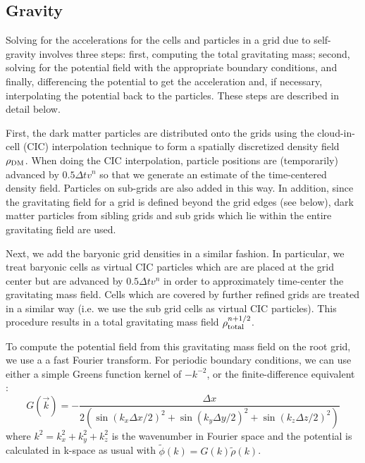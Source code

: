 \subsection{Gravity}
\label{sec.gravity}

Solving for the accelerations for the cells and particles in a grid due to self-gravity involves three steps: first, computing the total gravitating mass; second, solving for the potential field with the appropriate boundary conditions, and finally, differencing the potential to get the acceleration and, if necessary, interpolating the potential back to the particles. These steps are described in detail below.

First, the dark matter particles are distributed onto the grids using the cloud-in-cell (CIC) interpolation technique \citet{Hockney88} to form a spatially discretized density field $\rho_{\rm DM}$.  When doing the CIC interpolation, particle positions are (temporarily) advanced by $0.5 \Delta t v^n$ so that we generate an estimate of the time-centered density field.  Particles on sub-grids are also added in this way.  In addition, since the gravitating field for a grid is defined beyond the grid edges (see below), dark matter particles from sibling grids and sub grids which lie within the entire gravitating field are used.

Next, we add the baryonic grid densities in a similar fashion.  In particular, we treat baryonic cells as virtual CIC particles which are are placed at the grid center but are advanced by $0.5 \Delta t v^n$ in order to approximately time-center the gravitating mass field.  Cells which are covered by further refined grids are treated in a similar way (i.e. we use the sub grid cells as virtual CIC particles).  This procedure results in a total gravitating mass field $\rho_{\rm total}^{n+1/2}$.

To compute the potential field from this gravitating mass field on the root grid, we use a a fast Fourier transform. For periodic boundary conditions, we can use either a simple Greens function kernel of $-k^{-2}$, or the finite-difference equivalent \citep{Hockney88}:
\begin{equation}
G(\vec{k}) = - \frac{\Delta x}{2 \left( \sin(k_x \Delta x/2)^2 + \sin(k_y \Delta y/2)^2 + \sin(k_z \Delta z/2)^2 \right) }
\end{equation}
where $k^2 = k_x^2 + k_y^2 + k_z^2$ is the wavenumber in Fourier space and the potential is calculated in k-space as usual with $\tilde{\phi}(k) = G(k) \tilde{\rho}(k)$.  

